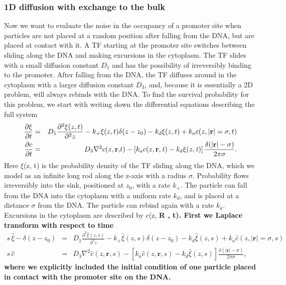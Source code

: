 \subsubsection{1D diffusion with exchange to the bulk}
Now we want to evaluate the noise in the occupancy of a promoter site when particles are not placed at a random position after falling from the DNA, but are placed at contact with it. A TF starting at the promoter site switches between sliding along the DNA and making excursions in the cytoplasm. The TF slides with a small diffusion constant $D_1$ and has the possibility of irreversibly binding to the promoter. After falling from the DNA, the TF diffuses around in the cytoplasm with a larger diffusion constant $D_3$, and, because it is essentially a 2D problem, will always rebinds with the DNA. To find the survival probability for this problem, we start with writing down the differential equations describing the full system
\setlength{\jot}{12pt}
\begin{eqnarray*}
 \frac{\partial \xi}{\partial t} & = & D_1 \frac{\partial^2\xi(z,t)}{\partial^2 z} - k_+ \xi(z,t) \delta(z - z_0) - k_d \xi(z,t) + k_a c(z, |\mathbf r \mathrm| = \sigma, t) \\
 \frac{\partial c}{\partial t} & = & D_3 \nabla^2 c(z, \mathbf r \mathrm, t) - \left[ k_a c(z, \bf r \it, t) - k_d \xi(z,t) \right] \frac{\delta(|\mathbf r \mathrm| - \sigma)}{2 \pi \sigma}.
\end{eqnarray*}
Here $\xi$(z, t) is the probability density of the TF sliding along the DNA, which we model as an infinite long rod along the z-axis with a radius $\sigma$. Probability flows irreversibly into the sink, positioned at $z_0$, with a rate $k_+$. The particle can fall from the DNA into the cytoplasm with a uniform rate $k_d$, and is placed at a distance $\sigma$ from the DNA. The particle can rebind again with a rate $k_a$. Excursions in the cytoplasm are described by $c$(z, \bf R \rm, t). First we Laplace transform with respect to time
\begin{eqnarray*}
 s \, \hat{\xi} - \delta(z - z_0) & = & D_1 \frac{\partial^2\hat{\xi}(z,s)}{\partial^2 z} - k_+ \hat{\xi}(z,s) \delta(z - z_0) - k_d \hat{\xi}(z,s) + k_a \hat{c}(z, |\mathbf r \mathrm| = \sigma , s) \\
 s \, \hat{c} & = & D_3 \nabla^2 \hat{c}(z, \mathbf r \mathrm, s) - \left[ k_a \hat{c}(z, \mathbf r \mathrm, s) - k_d \hat{\xi}(z,s) \right] \frac{\delta(|\mathbf r \mathrm| - \sigma)}{2 \pi \sigma},
\end{eqnarray*}
where we explicitly included the initial condition of one particle placed in contact with the promoter site on the DNA.
